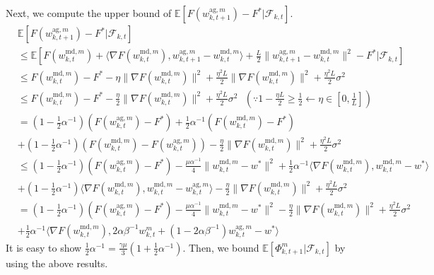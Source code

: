 Next, we compute the upper bound of $\mathbb{E}[F(w_{k, t+1}^{\textrm{ag}, m}) - F^*|\mathcal{F}_{k, t}]$.
\begin{align*}
    &\mathbb{E}[F(w_{k, t+1}^{\textrm{ag}, m}) - F^*|\mathcal{F}_{k, t}] \\
    &\leq \mathbb{E}[F(w_{k, t}^{\textrm{md}, m}) + \langle \nabla F(w_{k, t}^{\textrm{md}, m}), w_{k, t+1}^{\textrm{ag}, m} - w_{k, t}^{\textrm{md}, m} \rangle + \frac{L}{2}\|w_{k, t+1}^{\textrm{ag}, m} - w_{k, t}^{\textrm{md}, m}\|^2 - F^*|\mathcal{F}_{k, t}] \\
    &\leq F(w_{k, t}^{\textrm{md}, m}) -F^* - \eta\|\nabla F(w_{k, t}^{\textrm{md}, m})\|^2 + \frac{\eta^2 L}{2}\|\nabla F(w_{k, t}^{\textrm{md}, m})\|^2 + \frac{\eta^2 L}{2}\sigma^2 \\
    &\leq F(w_{k, t}^{\textrm{md}, m}) -F^* - \frac{\eta}{2}\|\nabla F(w_{k, t}^{\textrm{md}, m})\|^2 + \frac{\eta^2 L}{2}\sigma^2 \textrm{ }(\because 1-\frac{\eta L}{2} \geq \frac{1}{2} \leftarrow \eta \in [0, \frac{1}{L}]) \\
    &= (1-\frac{1}{2}\alpha^{-1})(F(w_{k, t}^{\textrm{ag}, m})-F^*) + \frac{1}{2}\alpha^{-1}(F(w_{k, t}^{\textrm{md}, m}) -F^*) \\
    &+ (1-\frac{1}{2}\alpha^{-1})(F(w_{k, t}^{\textrm{md}, m}) - F(w_{k, t}^{\textrm{ag}, m})) - \frac{\eta}{2}\|\nabla F(w_{k, t}^{\textrm{md}, m})\|^2 + \frac{\eta^2 L}{2}\sigma^2 \\
    &\leq (1-\frac{1}{2}\alpha^{-1})(F(w_{k, t}^{\textrm{ag}, m})-F^*) - \frac{\mu\alpha^{-1}}{4}\|w_{k, t}^{\textrm{md}, m}-w^*\|^2 + \frac{1}{2}\alpha^{-1} \langle \nabla F(w_{k, t}^{\textrm{md}, m}), w_{k, t}^{\textrm{md}, m}-w^*\rangle \\
    &+ (1-\frac{1}{2}\alpha^{-1})\langle \nabla F(w_{k, t}^{\textrm{md}, m}), w_{k, t}^{\textrm{md}, m} - w_{k, t}^{\textrm{ag}, m}\rangle - \frac{\eta}{2}\|\nabla F(w_{k, t}^{\textrm{md}, m})\|^2 + \frac{\eta^2 L}{2}\sigma^2 \\
    &= (1-\frac{1}{2}\alpha^{-1})(F(w_{k, t}^{\textrm{ag}, m})-F^*) - \frac{\mu\alpha^{-1}}{4}\|w_{k, t}^{\textrm{md}, m}-w^*\|^2 - \frac{\eta}{2}\|\nabla F(w_{k, t}^{\textrm{md}, m})\|^2 + \frac{\eta^2 L}{2}\sigma^2 \\
    &+ \frac{1}{2}\alpha^{-1} \langle \nabla F(w_{k, t}^{\textrm{md}, m}), 2\alpha\beta^{-1}w_{k, t}^m + (1 - 2\alpha\beta^{-1})w_{k, t}^{\textrm{ag}, m} - w^*\rangle
\end{align*}
It is easy to show $\frac{1}{2}\alpha^{-1} = \frac{\gamma\mu}{3}(1+\frac{1}{2}\alpha^{-1})$. Then, we bound $\mathbb{E}[\Phi_{k, t+1}^m|\mathcal{F}_{k, t}]$ by using the above results.
